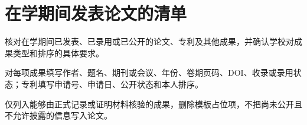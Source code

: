 \chapter*{在学期间发表论文的清单}
\thispagestyle{main}

\begin{writingplan}
  \item 核对在学期间已发表、已录用或已公开的论文、专利及其他成果，并确认学校对成果类型和排序的具体要求。
  \item 对每项成果填写作者、题名、期刊或会议、年份、卷期页码、DOI、收录或录用状态；专利填写申请号、申请日、公开状态和本人排序。
  \item 仅列入能够由正式记录或证明材料核验的成果，删除模板占位项，不把尚未公开且不允许披露的信息写入论文。
\end{writingplan}

